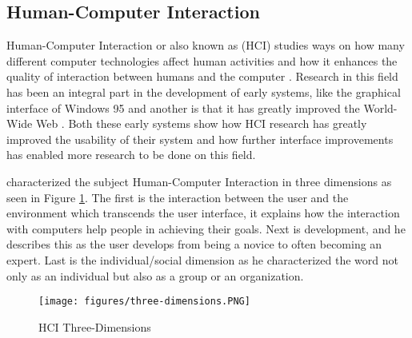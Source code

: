 
%

\subsection{Human-Computer Interaction}
Human-Computer Interaction or also known as (HCI) studies ways on how many different computer technologies affect human activities \cite{dix2009human} and how it enhances the quality of interaction between humans and the computer \cite{baecker2014readings}. Research in this field has been an integral part in the development of early systems, like the graphical interface of Windows 95 and another is that it has greatly improved the World-Wide Web \cite{myers1998brief}. Both these early systems show how HCI research has greatly improved the usability of their system and how further interface improvements has enabled more research to be done on this field. 

\citeauthor{kaptelinin1996activity} characterized the subject Human-Computer Interaction in three dimensions as seen in Figure \ref{fig:three_dimensions}. The first is the interaction between the user and the environment which transcends the user interface, it explains how the interaction with computers help people in achieving their goals. Next is development, and he describes this as the user develops from being a novice to often becoming an expert. Last is the individual/social dimension as he characterized the word  not only as an individual but also as a group or an organization.

\begin{figure}[H]
    \centering
    \texttt{[image: figures/three-dimensions.PNG]}
    \caption{HCI Three-Dimensions \protect\cite{kaptelinin1996activity}}
    \label{fig:three_dimensions}
\end{figure}

